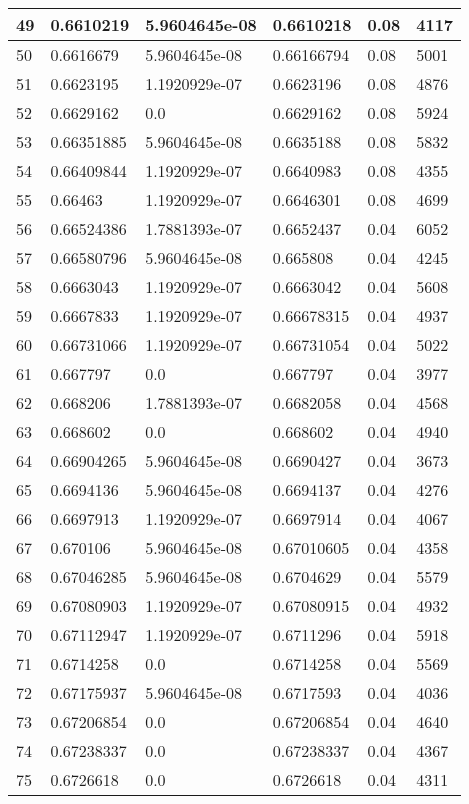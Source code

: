 \begin{longtable}{|l|l|l|l|l|l|}
49 & 0.6610219 & 5.9604645e-08 & 0.6610218 & 0.08 & 4117 \\ \hline 
50 & 0.6616679 & 5.9604645e-08 & 0.66166794 & 0.08 & 5001 \\ \hline 
51 & 0.6623195 & 1.1920929e-07 & 0.6623196 & 0.08 & 4876 \\ \hline 
52 & 0.6629162 & 0.0 & 0.6629162 & 0.08 & 5924 \\ \hline 
53 & 0.66351885 & 5.9604645e-08 & 0.6635188 & 0.08 & 5832 \\ \hline 
54 & 0.66409844 & 1.1920929e-07 & 0.6640983 & 0.08 & 4355 \\ \hline 
55 & 0.66463 & 1.1920929e-07 & 0.6646301 & 0.08 & 4699 \\ \hline 
56 & 0.66524386 & 1.7881393e-07 & 0.6652437 & 0.04 & 6052 \\ \hline 
57 & 0.66580796 & 5.9604645e-08 & 0.665808 & 0.04 & 4245 \\ \hline 
58 & 0.6663043 & 1.1920929e-07 & 0.6663042 & 0.04 & 5608 \\ \hline 
59 & 0.6667833 & 1.1920929e-07 & 0.66678315 & 0.04 & 4937 \\ \hline 
60 & 0.66731066 & 1.1920929e-07 & 0.66731054 & 0.04 & 5022 \\ \hline 
61 & 0.667797 & 0.0 & 0.667797 & 0.04 & 3977 \\ \hline 
62 & 0.668206 & 1.7881393e-07 & 0.6682058 & 0.04 & 4568 \\ \hline 
63 & 0.668602 & 0.0 & 0.668602 & 0.04 & 4940 \\ \hline 
64 & 0.66904265 & 5.9604645e-08 & 0.6690427 & 0.04 & 3673 \\ \hline 
65 & 0.6694136 & 5.9604645e-08 & 0.6694137 & 0.04 & 4276 \\ \hline 
66 & 0.6697913 & 1.1920929e-07 & 0.6697914 & 0.04 & 4067 \\ \hline 
67 & 0.670106 & 5.9604645e-08 & 0.67010605 & 0.04 & 4358 \\ \hline 
68 & 0.67046285 & 5.9604645e-08 & 0.6704629 & 0.04 & 5579 \\ \hline 
69 & 0.67080903 & 1.1920929e-07 & 0.67080915 & 0.04 & 4932 \\ \hline 
70 & 0.67112947 & 1.1920929e-07 & 0.6711296 & 0.04 & 5918 \\ \hline 
71 & 0.6714258 & 0.0 & 0.6714258 & 0.04 & 5569 \\ \hline 
72 & 0.67175937 & 5.9604645e-08 & 0.6717593 & 0.04 & 4036 \\ \hline 
73 & 0.67206854 & 0.0 & 0.67206854 & 0.04 & 4640 \\ \hline 
74 & 0.67238337 & 0.0 & 0.67238337 & 0.04 & 4367 \\ \hline 
75 & 0.6726618 & 0.0 & 0.6726618 & 0.04 & 4311 \\ \hline 
\end{longtable}